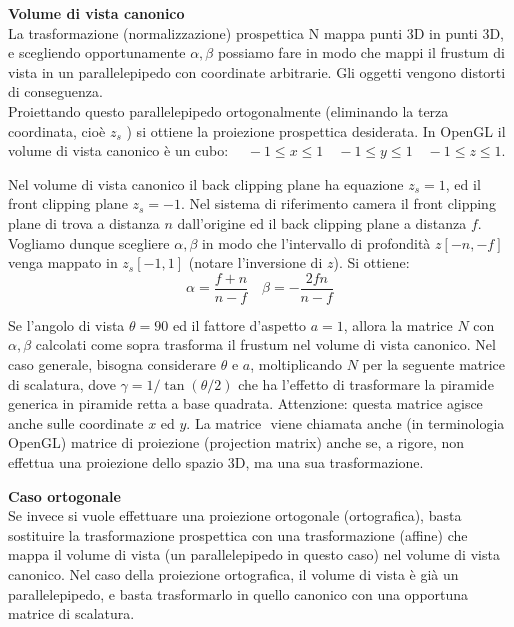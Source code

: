 \documentclass[a4paper, 10pt]{article}
\begin{document}
		\noindent
		\textbf{Volume di vista canonico}\\
		La trasformazione (normalizzazione) prospettica N mappa punti 3D in punti 3D, e scegliendo opportunamente $ \alpha, \beta $ possiamo fare in modo che mappi il frustum di vista in un parallelepipedo con coordinate arbitrarie. Gli oggetti vengono distorti di conseguenza.\\
		Proiettando questo parallelepipedo ortogonalmente (eliminando la terza coordinata, cioè 
		$ z_s $ ) si ottiene la proiezione prospettica desiderata. In OpenGL il volume di vista canonico è un cubo:	$\quad -1\leq x\leq 1 \quad -1\leq y\leq 1  \quad -1\leq z\leq 1 $.
		
		Nel volume di vista canonico il back clipping plane ha equazione $ z_s = 1 $, ed il front clipping plane $ z_s = -1 $. Nel sistema di riferimento camera il front clipping plane di
		trova a distanza $ n $ dall’origine ed il back clipping plane a distanza $ f $.\\
		Vogliamo dunque scegliere $ \alpha, \beta $ in modo che l’intervallo di profondità $ z [-n,-f] $ venga mappato in $ z_s [-1, 1] $ (notare l’inversione di $ z $).
		Si ottiene:
		\[
			\alpha = \dfrac{f + n}{n - f} \quad \beta = -\dfrac{2fn}{n - f}
		\]
	
		Se l’angolo di vista $ \theta = 90 $ ed il fattore d’aspetto $ a = 1 $, allora la matrice $ N $ con $ \alpha , \beta $ calcolati come sopra trasforma il frustum nel volume di vista canonico.
		Nel caso generale, bisogna considerare $ \theta $ e $ a $, moltiplicando $ N $ per la seguente matrice di scalatura, dove $ \gamma = 1/\tan(\theta/2) $ che ha l’effetto di trasformare la piramide generica in piramide retta a base quadrata. Attenzione: questa matrice agisce anche sulle coordinate $ x $ ed $ y $. La matrice $  $ viene chiamata anche (in terminologia OpenGL)
		matrice di proiezione (projection matrix) anche se, a rigore, non effettua una proiezione dello spazio 3D, ma una sua trasformazione.
	
		\textbf{Caso ortogonale}\\
		Se invece si vuole effettuare una proiezione ortogonale (ortografica), basta sostituire la trasformazione prospettica con una trasformazione (affine) che mappa il volume di vista
		(un parallelepipedo in questo caso) nel volume di vista canonico. Nel caso della proiezione ortografica, il volume di vista è già un parallelepipedo, e basta trasformarlo in quello canonico con una opportuna matrice di scalatura.
	
	
\end{document}
